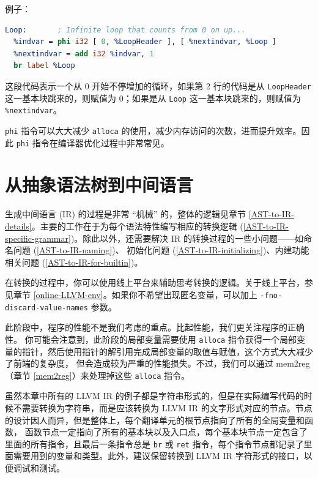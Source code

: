 例子：
\begin{lstlisting}[language=llvm]
Loop:       ; Infinite loop that counts from 0 on up...
  %indvar = phi i32 [ 0, %LoopHeader ], [ %nextindvar, %Loop ]
  %nextindvar = add i32 %indvar, 1
  br label %Loop
\end{lstlisting}

这段代码表示一个从 0 开始不停增加的循环，如果第 2 行的代码是从 \texttt{LoopHeader}
这一基本块跳来的，则赋值为 0；如果是从 \texttt{Loop} 这一基本块跳来的，则赋值为
\texttt{\%nextindvar}。

\texttt{phi} 指令可以大大减少 \texttt{alloca} 的使用，减少内存访问的次数，进而提升效率。因此
\texttt{phi} 指令在编译器优化过程中非常常见。

\section{从抽象语法树到中间语言}\label{AST-to-IR}

生成中间语言 (IR) 的过程是非常 “机械” 的，整体的逻辑见章节
\ref{AST-to-IR-details}。主要的工作在于为每个语法特性编写相应的转换逻辑
(\ref{AST-to-IR-specific-grammar})。除此以外，还需要解决
IR 的转换过程的一些小问题——如命名问题 (\ref{AST-to-IR-naming})、
初始化问题 (\ref{AST-to-IR-initializing})、内建功能相关问题
(\ref{AST-to-IR-for-builtin})。

在转换的过程中，你可以使用线上平台来辅助思考转换的逻辑。关于线上平台，参见章节
\ref{online-LLVM-env}。如果你不希望出现匿名变量，可以加上
\texttt{-fno-discard-value-names} 参数。

此阶段中，程序的性能不是我们考虑的重点。比起性能，我们更关注程序的正确性。
你可能会注意到，此阶段的局部变量需要使用 \texttt{alloca}
指令获得一个局部变量的指针，然后使用指针的解引用完成局部变量的取值与赋值，这个方式大大减少了前端的复杂度，
但会造成较为严重的性能损失。不过，我们可以通过 mem2reg（章节 \ref{mem2reg}）来处理掉这些
\texttt{alloca} 指令。

虽然本章中所有的 LLVM IR 的例子都是字符串形式的，但是在实际编写代码的时候不需要转换为字符串，而是应该转换为
LLVM IR 的文字形式对应的节点。节点的设计因人而异，但是整体上，每个翻译单元的根节点指向了所有的全局变量和函数，
函数节点一定指向了所有的基本块以及入口点，每个基本块节点一定包含了里面的所有指令，且最后一条指令总是
\texttt{br} 或 \texttt{ret} 指令，每个指令节点都记录了里面需要用到的变量和类型。此外，建议保留转换到
LLVM IR 字符形式的接口，以便调试和测试。

